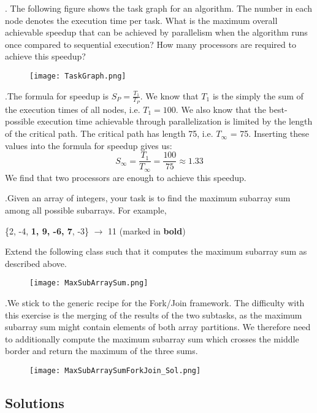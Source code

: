 \documentclass[main.tex]{subfiles}
\begin{document}
\begin{ExerciseList}
    \Exercise[title={Task Graph}, label=TG]. \quad The following figure shows the task graph for an algorithm. The number in each node denotes the execution time per task. What is the maximum overall achievable speedup that can be achieved by parallelism when the algorithm runs once compared to sequential execution? How many processors are required to achieve this speedup?
        \begin{figure}[h]
            \centering
            \texttt{[image: TaskGraph.png]}
        \end{figure}
    \Answer[ref={TG}].\quad The formula for speedup is $S_P = \frac{T_1}{T_P}$. We know that $T_1$ is the simply the sum of the execution times of all nodes, i.e. $T_1 = 100$. We also know that the best-possible execution time achievable through parallelization is limited by the length of the critical path. The critical path has length 75, i.e. $T_\infty$ = 75. Inserting these values into the formula for speedup gives us:
        \begin{equation*}
            S_\infty = \frac{T_1}{T_\infty} = \frac{100}{75} \approx 1.33
        \end{equation*}
        We find that two processors are enough to achieve this speedup.
        \pagebreak

    \Exercise[title={Fork/Join Framework},label=FJW].\quad Given an array of integers, your task is to find the maximum subarray sum among all possible subarrays. For example,
    \begin{center}
        \{2, -4, \textbf{1, 9, -6, 7}, -3\} $\rightarrow$ 11 (marked in \textbf{bold})
    \end{center}
    Extend the following class such that it computes the maximum subarray sum as described above.
    \begin{figure}[H]
        \centering
        \texttt{[image: MaxSubArraySum.png]}
    \end{figure}
    \pagebreak
    \Answer[ref={FJW}].\quad We stick to the generic recipe for the Fork/Join framework. The difficulty with this exercise is the merging of the results of the two subtasks, as the maximum subarray sum might contain elements of both array partitions. We therefore need to additionally compute the maximum subarray sum which crosses the middle border and return the maximum of the three sums.
        \begin{figure}[H]
            \centering
            \texttt{[image: MaxSubArraySumForkJoin\_Sol.png]}
        \end{figure}

\end{ExerciseList}
\newpage
\subsection{Solutions}
\shipoutAnswer
\end{document}
